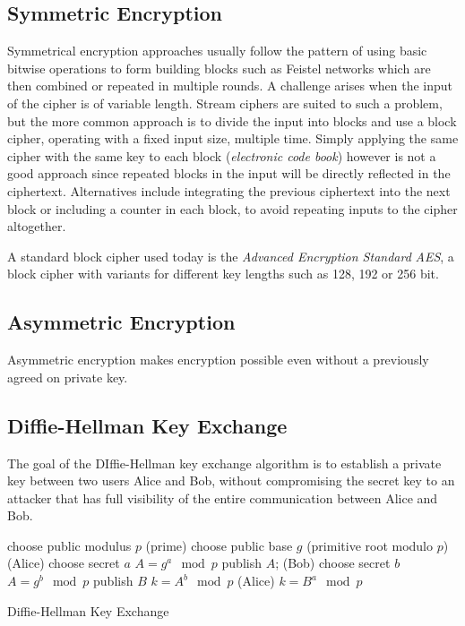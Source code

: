 \subsection{Symmetric Encryption}
Symmetrical encryption approaches usually follow the pattern of using basic
bitwise operations to form building blocks such as Feistel networks which are
then combined or repeated in multiple rounds. A challenge arises when the input
of the cipher is of variable length. Stream ciphers are suited to such a
problem, but the more common approach is to divide the input into blocks and use
a block cipher, operating with a fixed input size, multiple time. Simply
applying the same cipher with the same key to each block (\textit{electronic
code book}) however is not a good approach since repeated blocks in the input
will be directly reflected in the ciphertext. Alternatives include integrating
the previous ciphertext into the next block or including a counter in each
block, to avoid repeating inputs to the cipher altogether.

A standard block cipher used today is the \textit{Advanced Encryption Standard}
\emph{AES}, a block cipher with variants for different key lengths such as 128,
192 or 256 bit.

\subsection{Asymmetric Encryption}

Asymmetric encryption makes encryption possible even without a previously agreed
on private key.

\subsection{Diffie-Hellman Key Exchange}
The goal of the DIffie-Hellman key exchange algorithm is to establish a private
key between two users Alice and Bob, without compromising the secret key to an
attacker that has full visibility of the entire communication between Alice and
Bob.

\begin{algorithm}
    \SetAlgoLined
    
    choose public modulus $p$ (prime)\;
    choose public base $g$ (primitive root modulo $p$)\;
    \Begin(Alice){
        choose secret $a$\;
        $A = g^a \mod p$\;
        publish $A$;
    }
    \Begin(Bob){
        choose secret $b$\;
        $A = g^b \mod p$\;
        publish $B$\;
        $k = A^b \mod p$\;
    }
    \Begin(Alice){
        $k = B^a  \mod p$\;
    }
    \caption{Diffie-Hellman Key Exchange}
\end{algorithm}

